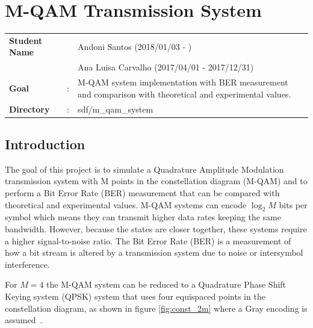 \clearpage



\section{M-QAM Transmission System}


\setcounter{tocdepth}{3}
\setcounter{secnumdepth}{3}

\begin{refsection}
	\begin{tcolorbox}
		\begin{tabular}{p{2.75cm} p{0.2cm} p{10.5cm}}
			\textbf{Student Name} & & Andoni Santos (2018/01/03 - )\\
														& & Ana Luisa Carvalho (2017/04/01 - 2017/12/31) \\
			\textbf{Goal}         &:& M-QAM system implementation with BER measurement and comparison with theoretical and experimental values.\\
			\textbf{Directory} &:& sdf/m\_qam\_system
		\end{tabular}
	\end{tcolorbox}

	\subsection{Introduction}

	The goal of this project is to simulate a Quadrature Amplitude Modulation
	transmission system with M points in the constellation diagram (M-QAM) and to
	perform a Bit Error Rate (BER) measurement that can be compared with theoretical
	and experimental values.
	M-QAM systems can encode $\log_2 M$ bits per symbol which means they can
	transmit higher data rates keeping the same bandwidth. However, because the states are closer together, these
	systems require a higher signal-to-noise ratio.
	The Bit Error Rate (BER) is a measurement of how a bit stream is altered by a
	transmission system due to noise or intersymbol interference.

	For $M=4$ the M-QAM system can be reduced to a Quadrature Phase Shift Keying
	system (QPSK) system that uses four equispaced points in the constellation
	diagram, as shown in figure \ref{fig:const_2m} where a Gray encoding is
	assumed~\cite{proakis08}.


\end{refsection}
